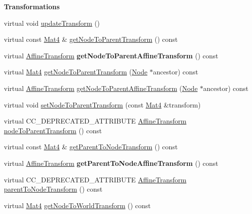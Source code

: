 \begin{Indent}\textbf{ Transformations}\par
\begin{DoxyCompactItemize}
\item 
virtual void \hyperlink{classNode_a8583decfa6069f06ec1e9f8080c1ae36}{update\+Transform} ()
\item 
virtual const \hyperlink{classMat4}{Mat4} \& \hyperlink{classNode_a7235b4a4d449fb7e01459c5c3b24d1eb}{get\+Node\+To\+Parent\+Transform} () const
\item 
\mbox{\label{classNode_a1230b4d08c4705599d6600415d27c10b}} 
virtual \hyperlink{structAffineTransform}{Affine\+Transform} {\bfseries get\+Node\+To\+Parent\+Affine\+Transform} () const
\item 
virtual \hyperlink{classMat4}{Mat4} \hyperlink{classNode_a0cc9a3bec00628f37f4742378bdcfcca}{get\+Node\+To\+Parent\+Transform} (\hyperlink{classNode}{Node} $\ast$ancestor) const
\item 
virtual \hyperlink{structAffineTransform}{Affine\+Transform} \hyperlink{classNode_a72a4d15c717622a50adb468ccc7fad2f}{get\+Node\+To\+Parent\+Affine\+Transform} (\hyperlink{classNode}{Node} $\ast$ancestor) const
\item 
virtual void \hyperlink{classNode_a36afac09102cefcdf692f20358add455}{set\+Node\+To\+Parent\+Transform} (const \hyperlink{classMat4}{Mat4} \&transform)
\item 
virtual C\+C\+\_\+\+D\+E\+P\+R\+E\+C\+A\+T\+E\+D\+\_\+\+A\+T\+T\+R\+I\+B\+U\+TE \hyperlink{structAffineTransform}{Affine\+Transform} \hyperlink{classNode_ab242ac36f0e26f5ef1f89e4a5fa4f02c}{node\+To\+Parent\+Transform} () const
\item 
virtual const \hyperlink{classMat4}{Mat4} \& \hyperlink{classNode_a12aae4242a85aa5acfc03c97a018b621}{get\+Parent\+To\+Node\+Transform} () const
\item 
\mbox{\label{classNode_a48ce099e686a648c4ffd96bde8f65293}} 
virtual \hyperlink{structAffineTransform}{Affine\+Transform} {\bfseries get\+Parent\+To\+Node\+Affine\+Transform} () const
\item 
virtual C\+C\+\_\+\+D\+E\+P\+R\+E\+C\+A\+T\+E\+D\+\_\+\+A\+T\+T\+R\+I\+B\+U\+TE \hyperlink{structAffineTransform}{Affine\+Transform} \hyperlink{classNode_af309d9c24935db52112193619f3cd790}{parent\+To\+Node\+Transform} () const
\item 
virtual \hyperlink{classMat4}{Mat4} \hyperlink{classNode_a1e46065101d0d5dba32262067d85bf23}{get\+Node\+To\+World\+Transform} () const

\end{DoxyCompactItemize}
\end{Indent}
